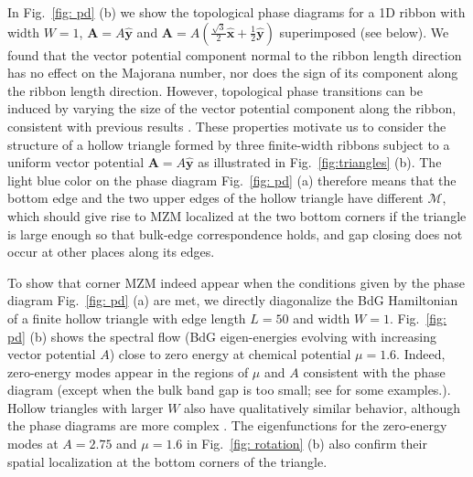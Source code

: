 \documentclass[aps,prb,twocolumn,showpacs,amsmath,amssymb,superscriptaddress]{revtex4-2}
\let\oldhat\hat
\renewcommand{\hat}[1]{\oldhat{\mathbf{#1}}}
\begin{document}
In Fig.~\ref{fig: pd} (b) we show the topological phase diagrams for a 1D ribbon with width $W=1$, $\mathbf A = A\hat{y}$ and $\mathbf A = A(\frac{\sqrt{3}}{2}\hat{x}+\frac{1}{2}\hat{y})$ superimposed (see below). We found that the vector potential component normal to the ribbon length direction has no effect on the Majorana number, nor does the sign of its component along the ribbon length direction. However, topological phase transitions can be induced by varying the size of the vector potential component along the ribbon, consistent with previous results \cite{romitoManipulatingMajoranaFermions2012, takasanSupercurrentinducedTopologicalPhase2022}. These properties motivate us to consider the structure of a hollow triangle formed by three finite-width ribbons subject to a uniform vector potential $\mathbf A = A\hat{y}$ as illustrated in Fig.~\ref{fig:triangles} (b). The light blue color on the phase diagram Fig.~\ref{fig: pd} (a) therefore means that the bottom edge and the two upper edges of the hollow triangle have different $\mathcal{M}$, which should give rise to MZM localized at the two bottom corners if the triangle is large enough so that bulk-edge correspondence holds, and gap closing does not occur at other places along its edges.

To show that corner MZM indeed appear when the conditions given by the phase diagram Fig.~\ref{fig: pd} (a) are met, we directly diagonalize the BdG Hamiltonian of a finite hollow triangle with edge length $L=50$ and width $W=1$. Fig.~\ref{fig: pd} (b) shows the spectral flow (BdG eigen-energies evolving with increasing vector potential $A$) close to zero energy at chemical potential $\mu=1.6$. Indeed, zero-energy modes appear in the regions of $\mu$ and $A$ consistent with the phase diagram (except when the bulk band gap is too small; see \cite{supp} for some examples.). Hollow triangles with larger $W$ also have qualitatively similar behavior, although the phase diagrams are more complex \cite{supp}. The eigenfunctions for the zero-energy modes at $A=2.75$ and $\mu=1.6$ in Fig.~\ref{fig: rotation} (b) also confirm their spatial localization at the bottom corners of the triangle.
\end{document}
